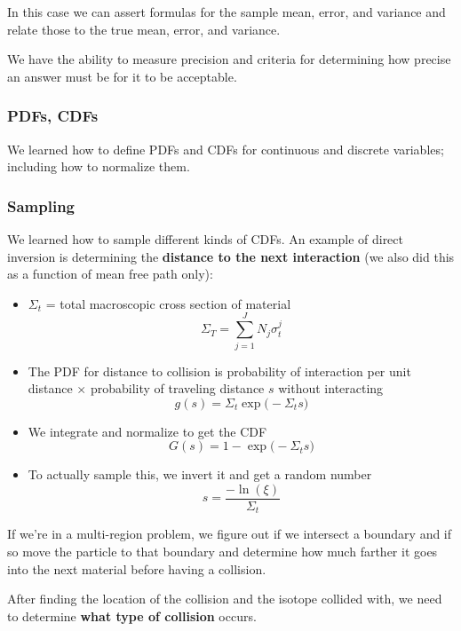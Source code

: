 \documentclass[12pt]{article}
\begin{document}
In this case we can assert formulas for the sample mean, error, and variance and relate those to the true mean, error, and variance. 

We have the ability to measure precision and criteria for determining how precise an answer must be for it to be acceptable. 


\subsubsection*{PDFs, CDFs}
We learned how to define PDFs and CDFs for continuous and discrete variables; including how to normalize them. 

\subsubsection*{Sampling}
We learned how to sample different kinds of CDFs. An example of direct inversion is determining the \textbf{distance to the next interaction} (we also did this as a function of mean free path only):

\begin{itemize}
\item $\Sigma_t$ = total macroscopic cross section of material
\[\Sigma_T = \sum_{j=1}^J N_j \sigma_t^j\]

\item The PDF for distance to collision is probability of interaction per unit distance $\times$ probability of traveling distance $s$ without interacting
\[g(s) = \Sigma_t \exp\bigl(-\Sigma_t s \bigr)\]

\item We integrate and normalize to get the CDF
\[G(s) = 1 - \exp\bigl(-\Sigma_t s \bigr)\]

\item To actually sample this, we invert it and get a random number
\[s = \frac{-\ln(\xi)}{\Sigma_t}\]
\end{itemize}
%
If we're in a multi-region problem, we figure out if we intersect a boundary and if so move the particle to that boundary and determine how much farther it goes into the next material before having a collision.

After finding the location of the collision and the isotope collided with, we need to determine \textbf{what type of collision} occurs. 
\end{document}

